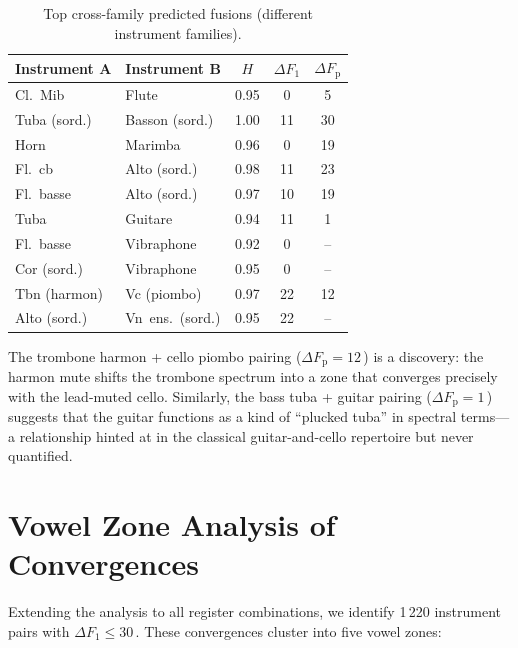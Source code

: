 \documentclass[journal]{IEEEtran}
\newcommand{\Fp}{F_\mathrm{p}}
\newcommand{\Hz}{\,\text{Hz}}
\begin{document}
\begin{table}[!t]
\centering
\caption{Top cross-family predicted fusions (different instrument families).}
\label{tab:fusions}
\small
\begin{tabular}{@{}llccc@{}}
\toprule
\textbf{Instrument A} & \textbf{Instrument B} & $H$ & $\Delta F_1$ & $\Delta\Fp$ \\
\midrule
Cl.~Mib         & Flute            & 0.95 &  0  &  5 \\
Tuba (sord.)    & Basson (sord.)   & 1.00 & 11  & 30 \\
Horn            & Marimba          & 0.96 &  0  & 19 \\
Fl.~cb          & Alto (sord.)     & 0.98 & 11  & 23 \\
Fl.~basse       & Alto (sord.)     & 0.97 & 10  & 19 \\
Tuba            & Guitare          & 0.94 & 11  &  1 \\
Fl.~basse       & Vibraphone       & 0.92 &  0  &  -- \\
Cor (sord.)     & Vibraphone       & 0.95 &  0  &  -- \\
Tbn (harmon)    & Vc (piombo)      & 0.97 & 22  & 12 \\
Alto (sord.)    & Vn~ens.~(sord.)  & 0.95 & 22  &  -- \\
\bottomrule
\end{tabular}
\end{table}

The trombone harmon + cello piombo pairing ($\Delta\Fp = 12$\Hz) is a discovery: the harmon mute shifts the trombone spectrum into a zone that converges precisely with the lead-muted cello. Similarly, the bass tuba + guitar pairing ($\Delta\Fp = 1$\Hz) suggests that the guitar functions as a kind of ``plucked tuba'' in spectral terms---a relationship hinted at in the classical guitar-and-cello repertoire but never quantified.

\section{Vowel Zone Analysis of Convergences}
\label{sec:vowels}

Extending the analysis to all register combinations, we identify 1\,220 instrument pairs with $\Delta F_1 \leq 30$\Hz. These convergences cluster into five vowel zones:
\end{document}
